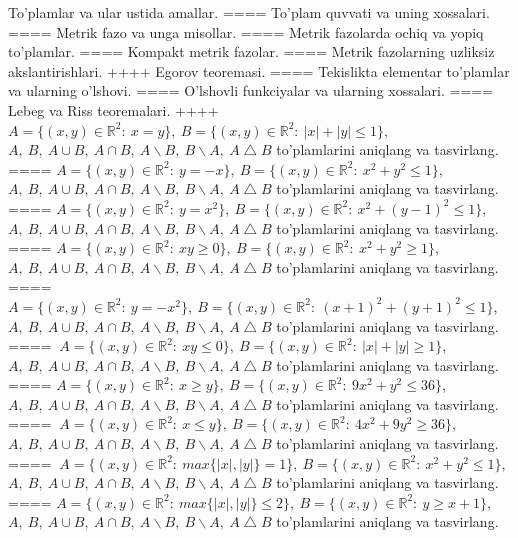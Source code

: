 To'plamlar va ular ustida amallar.
====
To'plam quvvati va uning xossalari.
====
Metrik fazo va unga misollar.
====
Metrik fazolarda ochiq va yopiq to'plamlar.
====
Kompakt metrik fazolar.
====
Metrik fazolarning uzliksiz akslantirishlari.
++++
Egorov teoremasi.
====
Tekislikta elementar to'plamlar va ularning o'lshovi.
====
O'lshovli funkciyalar va ularning xossalari.
====
Lebeg va Riss teoremalari.
++++
\(A = \{(x,y) \in \mathbb{R}^{2}:\ x = y\},\ B = \{(x,y) \in \mathbb{R}^{2}:\ |x| + |y| \leq 1\}\), \(A,\ B,\ A \cup B,\ A \cap B,\ A \backslash B,\ B \backslash A,\ A \bigtriangleup B\) to'plamlarini aniqlang va tasvirlang.
====
\(A = \{(x,y) \in \mathbb{R}^{2}:\ y = - x\},\ B = \{(x,y) \in \mathbb{R}^{2}:\ x^{2} + y^{2} \leq 1\}\), \(A,\ B,\ A \cup B,\ A \cap B,\ A \backslash B,\ B \backslash A,\ A \bigtriangleup B\) to'plamlarini aniqlang va tasvirlang.
====
\(A = \{(x,y) \in \mathbb{R}^{2}:\ y = x^{2}\},\ B = \{(x,y) \in \mathbb{R}^{2}:\ x^{2} + (y - 1)^{2} \leq 1\}\), \(A,\ B,\ A \cup B,\ A \cap B,\ A \backslash B,\ B \backslash A,\ A \bigtriangleup B\) to'plamlarini aniqlang va tasvirlang.
====
\(A = \{(x,y) \in \mathbb{R}^{2}:\ xy \geq 0\},\ B = \{(x,y) \in \mathbb{R}^{2}:\ x^{2} + y^{2} \geq 1\}\), \(A,\ B,\ A \cup B,\ A \cap B,\ A \backslash B,\ B \backslash A,\ A \bigtriangleup B\) to'plamlarini aniqlang va tasvirlang.
====
\(A = \{(x,y) \in \mathbb{R}^{2}:\ y = - x^{2}\},\ B = \{(x,y) \in \mathbb{R}^{2}:\ (x + 1)^{2} + (y + 1)^{2} \leq 1\}\), \(A,\ B,\ A \cup B,\ A \cap B,\ A \backslash B,\ B \backslash A,\ A \bigtriangleup B\) to'plamlarini aniqlang va tasvirlang.
====
\(\ A = \{(x,y) \in \mathbb{R}^{2}:\ xy \leq 0\},\ B = \{(x,y) \in \mathbb{R}^{2}:\ |x| + |y| \geq 1\}\), \(A,\ B,\ A \cup B,\ A \cap B,\ A \backslash B,\ B \backslash A,\ A \bigtriangleup B\) to'plamlarini aniqlang va tasvirlang.
====
\(A = \{(x,y) \in \mathbb{R}^{2}:\ x \geq y\},\ B = \{(x,y) \in \mathbb{R}^{2}:\ 9x^{2} + y^{2} \leq 36\}\),\(A,\ B,\ A \cup B,\ A \cap B,\ A \backslash B,\ B \backslash A,\ A \bigtriangleup B\) to'plamlarini aniqlang va tasvirlang.
====
\(\ A = \{(x,y) \in \mathbb{R}^{2}:\ x \leq y\},\ B = \{(x,y) \in \mathbb{R}^{2}:\ 4x^{2} + 9y^{2} \geq 36\}\), \(A,\ B,\ A \cup B,\ A \cap B,\ A \backslash B,\ B \backslash A,\ A \bigtriangleup B\) to'plamlarini aniqlang va tasvirlang.
====
\(\ A = \{(x,y) \in \mathbb{R}^{2}:\ max\{|x|,|y|\} = 1\},\ B = \{(x,y) \in \mathbb{R}^{2}:\ x^{2} + y^{2} \leq 1\}\), \(A,\ B,\ A \cup B,\ A \cap B,\ A \backslash B,\ B \backslash A,\ A \bigtriangleup B\) to'plamlarini aniqlang va tasvirlang.
====
\(A = \{(x,y) \in \mathbb{R}^{2}:\ max\{|x|,|y|\} \leq 2\},\ B = \{(x,y) \in \mathbb{R}^{2}:\ y \geq x + 1\}\), \(A,\ B,\ A \cup B,\ A \cap B,\ A \backslash B,\ B \backslash A,\ A \bigtriangleup B\) to'plamlarini aniqlang va tasvirlang.
